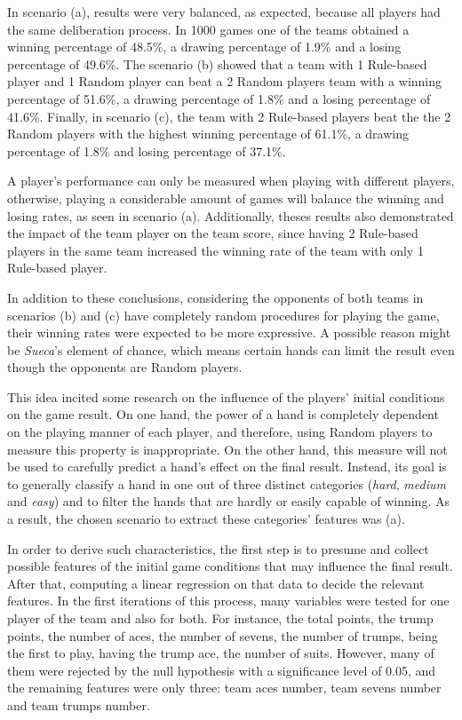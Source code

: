In scenario (a), results were very balanced, as expected, because all players had the same deliberation process.
In 1000 games one of the teams obtained a winning percentage of 48.5\%, a drawing percentage of 1.9\% and a losing percentage of 49.6\%.
The scenario (b) showed that a team with 1 Rule-based player and 1 Random player can beat a 2 Random players team with a winning percentage of 51.6\%, a drawing percentage of 1.8\% and a losing percentage of 41.6\%.
Finally, in scenario (c), the team with 2 Rule-based players beat the the 2 Random players with the highest winning percentage of 61.1\%, a drawing percentage of 1.8\% and losing percentage of 37.1\%.

A player's performance can only be measured when playing with different players, otherwise, playing a considerable amount of games will balance the winning and losing rates, as seen in scenario (a).
Additionally, theses results also demonstrated the impact of the team player on the team score, since having 2 Rule-based players in the same team increased the winning rate of the team with only 1 Rule-based player.

In addition to these conclusions, considering the opponents of both teams in scenarios (b) and (c) have completely random procedures for playing the game, their winning rates were expected to be more expressive.
A possible reason might be \emph{Sueca}'s element of chance, which means certain hands can limit the result even though the opponents are Random players.

This idea incited some research on the influence of the players' initial conditions on the game result.
On one hand, the power of a hand is completely dependent on the playing manner of each player, and therefore, using Random players to measure this property is inappropriate.
On the other hand, this measure will not be used to carefully predict a hand's effect on the final result.
Instead, its goal is to generally classify a hand in one out of three distinct categories (\emph{hard}, \emph{medium} and \emph{easy}) and to filter the hands that are hardly or easily capable of winning.
As a result, the chosen scenario to extract these categories' features was (a).

In order to derive such characteristics, the first step is to presume and collect possible features of the initial game conditions that may influence the final result.
After that, computing a linear regression on that data to decide the relevant features.
In the first iterations of this process, many variables were tested for one player of the team and also for both.
For instance, the total points, the trump points, the number of aces, the number of sevens, the number of trumps, being the first to play, having the trump ace, the number of suits.
However, many of them were rejected by the null hypothesis with a significance level of 0.05, and the remaining features were only three: team aces number, team sevens number and team trumps number.

